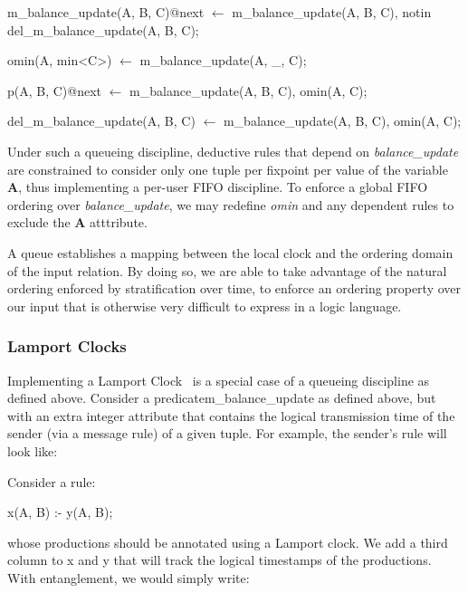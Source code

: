 \begin{Dedalus}

m\_balance\_update(A, B, C)@next \(\leftarrow\)
  m\_balance\_update(A, B, C),
  notin del\_m\_balance\_update(A, B, C);

omin(A, min<C>) \(\leftarrow\)
  m\_balance_update(A, _, C);

p(A, B, C)@next \(\leftarrow\)
  m\_balance\_update(A, B, C),
  omin(A, C);

del\_m\_balance\_update(A, B, C) \(\leftarrow\)
  m\_balance\_update(A, B, C),
  omin(A, C);
\end{Dedalus}

Under such a queueing discipline, deductive rules that depend on
\emph{balance\_update} are constrained to consider only one tuple per fixpoint
per value of the variable \textbf{A}, thus implementing a per-user FIFO
discipline.  To enforce a global FIFO ordering over \emph{balance\_update}, we
may redefine \emph{omin} and any dependent rules to exclude the \textbf{A}
atttribute.

A queue establishes a mapping between the local clock and the ordering domain of the input relation. By doing so, we are able to take
advantage of the natural ordering enforced by stratification over time, to enforce an ordering property over our input that is otherwise 
very difficult to express in a logic language.

\subsubsection{Lamport Clocks}

Implementing a Lamport Clock~\cite{timeclocks} is a special case of a queueing discipline as defined above.
Consider a predicate{m\_balance\_update} as defined above, but with an extra integer attribute that contains the logical transmission
time of the sender (via a message rule) of a given tuple.  For example, the sender's rule will look like: 


Consider a rule:
\begin{Dedalus}
x(A, B) :- y(A, B);
\end{Dedalus}
whose productions should be annotated using a Lamport clock.  We add a
third column to x and y that will track the logical timestamps of the
productions.  With entanglement, we would simply write:

